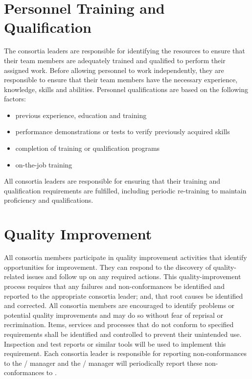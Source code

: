 \section{Personnel Training and Qualification}

The  consortia leaders are responsible for identifying the
resources to ensure that their team members are adequately trained and
qualified to perform their assigned work. Before allowing personnel to
work independently, they are responsible to ensure that their team
members have the necessary experience, knowledge, skills and
abilities. Personnel qualifications are based on the following
factors:
\begin{itemize}
 \item previous experience, education and training
 \item performance demonstrations or tests to verify previously acquired skills
 \item completion of training or qualification programs
 \item on-the-job training
\end{itemize}

All  consortia leaders are responsible for ensuring that their
training and qualification requirements are fulfilled, including
periodic re-training to maintain proficiency and qualifications.


\section{Quality Improvement}
\label{sec:quality_improvement}

All  consortia members participate in quality improvement
activities that identify opportunities for improvement. They can
respond to the discovery of quality-related issues and follow up on
any required actions. This quality-improvement process requires that
any failures and non-conformances be identified and reported to the
appropriate consortia leader; and, that root causes be identified and
corrected. All consortia members are encouraged to identify problems
or potential quality improvements and may do so without fear of
reprisal or recrimination. Items, services and processes that do not
conform to specified requirements shall be identified and controlled
to prevent their unintended use. Inspection and test reports or
similar tools will be used to implement this requirement. Each
consortia leader is responsible for reporting non-conformances to the
/  manager and the /
 manager will periodically report these non-conformances to
 .

